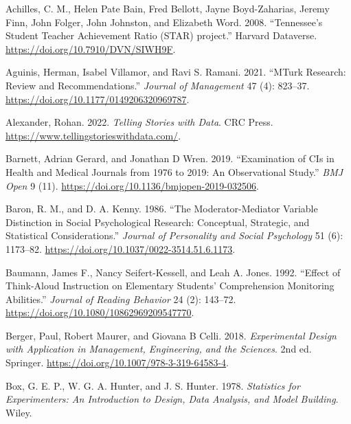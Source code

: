 \documentclass[
  11pt,
  letterpaper,
]{scrbook}
\newlength{\cslhangindent}
\newlength{\cslentryspacingunit} %
\newenvironment{CSLReferences}[2] %
 {%
  \setlength{\parindent}{0pt}
  \ifodd #1
  \let\oldpar\par
  \def\par{\hangindent=\cslhangindent\oldpar}
  \fi
  \setlength{\parskip}{#2\cslentryspacingunit}
 }%
 {}
\theoremstyle{definition}
\theoremstyle{remark}
\begin{document}
\hypertarget{refs}{}
\begin{CSLReferences}{1}{0}
\leavevmode{}%
Achilles, C. M., Helen Pate Bain, Fred Bellott, Jayne Boyd-Zaharias,
Jeremy Finn, John Folger, John Johnston, and Elizabeth Word. 2008.
{``{Tennessee's Student Teacher Achievement Ratio (STAR) project}.''}
Harvard Dataverse. \url{https://doi.org/10.7910/DVN/SIWH9F}.

\leavevmode{}%
Aguinis, Herman, Isabel Villamor, and Ravi S. Ramani. 2021. {``{MT}urk
Research: Review and Recommendations.''} \emph{Journal of Management} 47
(4): 823--37. \url{https://doi.org/10.1177/0149206320969787}.

\leavevmode{}%
Alexander, Rohan. 2022. \emph{Telling Stories with Data}. CRC Press.
\url{https://www.tellingstorieswithdata.com/}.

\leavevmode{}%
Barnett, Adrian Gerard, and Jonathan D Wren. 2019. {``Examination of
{CI}s in Health and Medical Journals from 1976 to 2019: An Observational
Study.''} \emph{BMJ Open} 9 (11).
\url{https://doi.org/10.1136/bmjopen-2019-032506}.

\leavevmode{}%
Baron, R. M., and D. A. Kenny. 1986. {``The Moderator-Mediator Variable
Distinction in Social Psychological Research: Conceptual, Strategic, and
Statistical Considerations.''} \emph{Journal of Personality and Social
Psychology} 51 (6): 1173--82.
\url{https://doi.org/10.1037/0022-3514.51.6.1173}.

\leavevmode{}%
Baumann, James F., Nancy Seifert-Kessell, and Leah A. Jones. 1992.
{``Effect of Think-Aloud Instruction on Elementary Students'
Comprehension Monitoring Abilities.''} \emph{Journal of Reading
Behavior} 24 (2): 143--72.
\url{https://doi.org/10.1080/10862969209547770}.

\leavevmode{}%
Berger, Paul, Robert Maurer, and Giovana B Celli. 2018.
\emph{Experimental Design with Application in Management, Engineering,
and the Sciences}. 2nd ed. Springer.
\url{https://doi.org/10.1007/978-3-319-64583-4}.

\leavevmode{}%
Box, G. E. P., W. G. A. Hunter, and J. S. Hunter. 1978. \emph{Statistics
for Experimenters: An Introduction to Design, Data Analysis, and Model
Building}. Wiley.


\end{CSLReferences}
\end{document}

